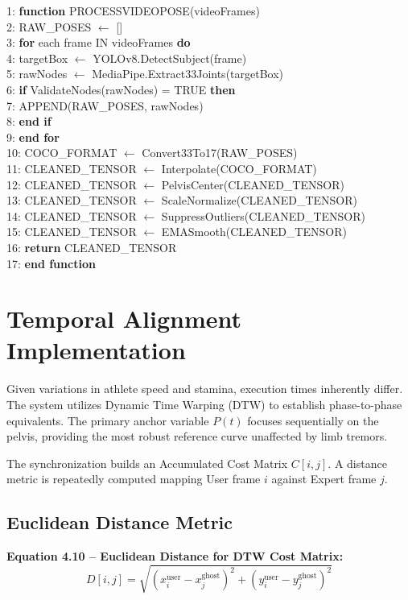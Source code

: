 \begin{sloppypar}
1: \textbf{function} PROCESSVIDEOPOSE(videoFrames)\\
2: \quad RAW\_POSES $\leftarrow$ []\\
3: \quad \textbf{for} each frame IN videoFrames \textbf{do}\\
4: \qquad targetBox $\leftarrow$ YOLOv8.DetectSubject(frame)\\
5: \qquad rawNodes $\leftarrow$ MediaPipe.Extract33Joints(targetBox)\\
6: \qquad \textbf{if} ValidateNodes(rawNodes) = TRUE \textbf{then}\\
7: \qquad\quad APPEND(RAW\_POSES, rawNodes)\\
8: \qquad \textbf{end if}\\
9: \quad \textbf{\textbf{end for}}\\
10: \quad COCO\_FORMAT $\leftarrow$ Convert33To17(RAW\_POSES)\\
11: \quad CLEANED\_TENSOR $\leftarrow$ Interpolate(COCO\_FORMAT)\\
12: \quad CLEANED\_TENSOR $\leftarrow$ PelvisCenter(CLEANED\_TENSOR)\\
13: \quad CLEANED\_TENSOR $\leftarrow$ ScaleNormalize(CLEANED\_TENSOR)\\
14: \quad CLEANED\_TENSOR $\leftarrow$ SuppressOutliers(CLEANED\_TENSOR)\\
15: \quad CLEANED\_TENSOR $\leftarrow$ EMASmooth(CLEANED\_TENSOR)\\
16: \quad \textbf{return} CLEANED\_TENSOR\\
17: \textbf{end function}
\algofooter


\section{Temporal Alignment Implementation}

Given variations in athlete speed and stamina, execution times inherently differ. The system utilizes Dynamic Time Warping (DTW) \cite{dtw_sakoe} to establish phase-to-phase equivalents. The primary anchor variable $P(t)$ focuses sequentially on the pelvis, providing the most robust reference curve unaffected by limb tremors.

The synchronization builds an Accumulated Cost Matrix $C[i,j]$. A distance metric is repeatedly computed mapping User frame $i$ against Expert frame $j$.  

\subsection{Euclidean Distance Metric}
\textbf{Equation 4.10 -- Euclidean Distance for DTW Cost Matrix:}
\begin{equation}
D[i, j] = \sqrt{(x^{\text{user}}_i - x^{\text{ghost}}_j)^2 + (y^{\text{user}}_i - y^{\text{ghost}}_j)^2}
\tag{4.10}
\end{equation}


\end{sloppypar}
